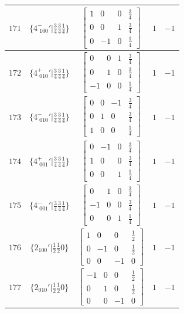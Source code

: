 \documentclass[fleqn,8pt]{jsarticle}
\begin{document}
\begin{longtable}{ccccc}
$ 171 $ & $ \{4^{-}_{\,\,100}{}'|\frac{3}{4} \frac{3}{4} \frac{1}{4}\} $ & $ \begin{bmatrix} 1 & 0 & 0 & \frac{3}{4} \\ 0 & 0 & 1 & \frac{3}{4} \\ 0 & -1 & 0 & \frac{1}{4} \end{bmatrix} $ & $ 1 $ & $ -1 $ \\ \hline
$ 172 $ & $ \{4^{+}_{\,\,010}{}'|\frac{3}{4} \frac{3}{4} \frac{1}{4}\} $ & $ \begin{bmatrix} 0 & 0 & 1 & \frac{3}{4} \\ 0 & 1 & 0 & \frac{3}{4} \\ -1 & 0 & 0 & \frac{1}{4} \end{bmatrix} $ & $ 1 $ & $ -1 $ \\ \hline
$ 173 $ & $ \{4^{-}_{\,\,010}{}'|\frac{3}{4} \frac{3}{4} \frac{1}{4}\} $ & $ \begin{bmatrix} 0 & 0 & -1 & \frac{3}{4} \\ 0 & 1 & 0 & \frac{3}{4} \\ 1 & 0 & 0 & \frac{1}{4} \end{bmatrix} $ & $ 1 $ & $ -1 $ \\ \hline
$ 174 $ & $ \{4^{+}_{\,\,001}{}'|\frac{3}{4} \frac{3}{4} \frac{1}{4}\} $ & $ \begin{bmatrix} 0 & -1 & 0 & \frac{3}{4} \\ 1 & 0 & 0 & \frac{3}{4} \\ 0 & 0 & 1 & \frac{1}{4} \end{bmatrix} $ & $ 1 $ & $ -1 $ \\ \hline
$ 175 $ & $ \{4^{-}_{\,\,001}{}'|\frac{3}{4} \frac{3}{4} \frac{1}{4}\} $ & $ \begin{bmatrix} 0 & 1 & 0 & \frac{3}{4} \\ -1 & 0 & 0 & \frac{3}{4} \\ 0 & 0 & 1 & \frac{1}{4} \end{bmatrix} $ & $ 1 $ & $ -1 $ \\ \hline
$ 176 $ & $ \{2{}_{100}{}'|\frac{1}{2} \frac{1}{2} 0\} $ & $ \begin{bmatrix} 1 & 0 & 0 & \frac{1}{2} \\ 0 & -1 & 0 & \frac{1}{2} \\ 0 & 0 & -1 & 0 \end{bmatrix} $ & $ 1 $ & $ -1 $ \\ \hline
$ 177 $ & $ \{2{}_{010}{}'|\frac{1}{2} \frac{1}{2} 0\} $ & $ \begin{bmatrix} -1 & 0 & 0 & \frac{1}{2} \\ 0 & 1 & 0 & \frac{1}{2} \\ 0 & 0 & -1 & 0 \end{bmatrix} $ & $ 1 $ & $ -1 $ \\ \hline

\end{longtable}
\end{document}
